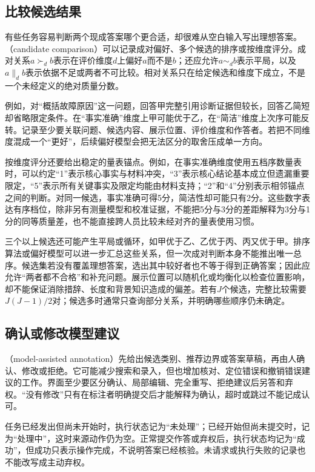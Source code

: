 \subsection{比较候选结果}
\label{sec:knowledge-acquisition-human-comparison}

有些任务容易判断两个现成答案哪个更合适，却很难从空白输入写出理想答案。（candidate comparison）可以记录成对偏好、多个候选的排序或按维度评分。成对关系$a\succ_d b$表示在评价维度$d$上偏好$a$而不是$b$；还应允许$a\sim_d b$表示平局，以及$a\parallel_d b$表示依据不足或两者不可比较。相对关系只在给定候选和维度下成立，不是一个未经定义的绝对质量分数。

例如，对“概括故障原因”这一问题，回答甲完整引用诊断证据但较长，回答乙简短却省略限定条件。在“事实准确”维度上甲可能优于乙，在“简洁”维度上次序可能反转。记录至少要关联问题、候选内容、展示位置、评价维度和作答者。若把不同维度混成一个“更好”，后续偏好模型会把无法区分的取舍压成单一方向。

按维度评分还要给出稳定的量表锚点。例如，在事实准确维度使用五档序数量表时，可以约定“1”表示核心事实与材料冲突，“3”表示核心结论基本成立但遗漏重要限定，“5”表示所有关键事实及限定均能由材料支持；“2”和“4”分别表示相邻锚点之间的判断。对同一候选，事实准确可得5分，简洁性却可能只有2分。这些数字表达有序档位，除非另有测量模型和校准证据，不能把5分与3分的差距解释为3分与1分的同等质量差，也不能直接跨人员比较未经对齐的量表使用习惯。

三个以上候选还可能产生平局或循环，如甲优于乙、乙优于丙、丙又优于甲。排序算法或偏好模型可以进一步汇总这些关系，但一次成对判断本身不能推出唯一总序。候选集若没有覆盖理想答案，选出其中较好者也不等于得到正确答案；因此应允许“两者都不合格”和补充问题。展示位置可以随机化或均衡化以检查位置影响，却不能保证消除措辞、长度和背景知识造成的偏差。若有$J$个候选，完整比较需要$J(J-1)/2$对；候选多时通常只查询部分关系，并明确哪些顺序仍未确定。

\subsection{确认或修改模型建议}
\label{sec:knowledge-acquisition-human-model-suggestion}

（model-assisted annotation）先给出候选类别、推荐边界或答案草稿，再由人确认、修改或拒绝。它可能减少搜索和录入，但也增加核对、定位错误和撤销错误建议的工作。界面至少要区分确认、局部编辑、完全重写、拒绝建议后另答和弃权。“没有修改”只有在标注者明确提交后才能解释为确认，超时或跳过不能记成认可。

任务已经发出但尚未开始时，执行状态记为“未处理”；已经开始但尚未提交时，记为“处理中”，这时来源动作仍为空。正常提交作答或弃权后，执行状态均记为“成功”，但成功只表示操作完成，不说明答案已经核验。未请求或执行失败的记录也不能改写成主动弃权。

